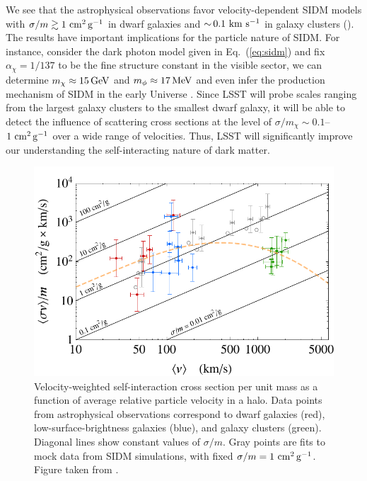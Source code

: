We see that the astrophysical observations favor velocity-dependent SIDM models with $\sigma/m\gtrsim 1 \mathrm{\,\mathrm{\,cm}^2\mathrm{\,g}^{-1}}$ in dwarf galaxies and $ {\sim}\, 0.1 \mathrm{\,\mathrm{\,km}\,\mathrm{\,s}^{-1}}$ in galaxy clusters (). The results have important implications for the particle nature of SIDM. For instance, consider the dark photon model given in Eq.~(\ref{eq:sidm}) and fix $\alpha_\chi=1/137$ to be the fine structure constant in the visible sector, we can determine $m_\chi\approx 15 \mathrm{\,GeV}$ and $m_\phi \approx 17 \mathrm{\,MeV}$ \citep{Kaplinghat:2015aga} and even infer the production mechanism of SIDM in the early Universe \citep{Huo:2017vef}. Since LSST will probe scales ranging from the largest galaxy clusters to the smallest dwarf galaxy, it will be able to detect the influence of scattering cross sections at the level of $\sigma/m_\chi \sim 0.1$--$1 \mathrm{\,\mathrm{\,cm}^2\mathrm{\,g}^{-1}}$ over a wide range of velocities. Thus, LSST will significantly improve our understanding the self-interacting nature of dark matter. 

\begin{figure}
\centering
\includegraphics[width=0.6\columnwidth]{figures/sigmav.pdf}
\caption{Velocity-weighted self-interaction cross section per unit mass as a function of average relative particle velocity in a halo. Data points from astrophysical observations correspond to dwarf galaxies (red), low-surface-brightness galaxies (blue), and galaxy clusters (green). 
Diagonal lines show constant values of $\sigma/m$. 
Gray points are fits to mock data from SIDM simulations, with fixed $\sigma/m = 1 \mathrm{\,\mathrm{\,cm}^2\mathrm{\,g}^{-1}}$.
Figure taken from \citet{Kaplinghat:2015aga}.
}
\label{fig:sidm_sigma}
\end{figure}






